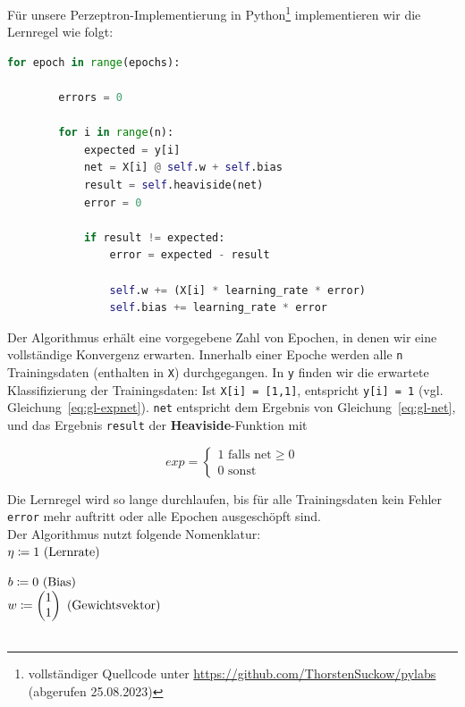 \pagebreak
Für unsere Perzeptron-Implementierung in Python\footnote{
    vollständiger Quellcode unter \url{https://github.com/ThorstenSuckow/pylabs} (abgerufen 25.08.2023)
} implementieren wir die Lernregel wie folgt:


\begin{lstlisting}[language=Python]
    for epoch in range(epochs):

        errors = 0

        for i in range(n):
            expected = y[i]
            net = X[i] @ self.w + self.bias
            result = self.heaviside(net)
            error = 0

            if result != expected:
                error = expected - result

                self.w += (X[i] * learning_rate * error)
                self.bias += learning_rate * error
\end{lstlisting}

\noindent
Der Algorithmus erhält eine vorgegebene Zahl von Epochen, in denen wir eine vollständige Konvergenz erwarten.
Innerhalb einer Epoche werden alle \verb|n| Trainingsdaten (enthalten in \verb|X|) durchgegangen.
In \verb|y| finden wir die erwartete Klassifizierung der Trainingsdaten:
Ist \verb|X[i] = [1,1]|, entspricht \verb|y[i] = 1| (vgl. Gleichung~\ref{eq:gl-expnet}).
\verb|net| entspricht dem Ergebnis von Gleichung~\ref{eq:gl-net}, und das Ergebnis \verb|result| der \textbf{Heaviside}-Funktion mit

\begin{equation}
    exp = \begin{cases}
              1 \text{ falls } \text{net} \geq 0 \\
              0 \text{ sonst}
    \end{cases}
    \label{eq:gl-expnet}
\end{equation}

\noindent
Die Lernregel wird so lange durchlaufen, bis für alle Trainingsdaten kein Fehler \verb|error| mehr auftritt oder alle Epochen ausgeschöpft sind.\\

\noindent
Der Algorithmus nutzt folgende Nomenklatur:\\


$\eta \coloneqq 1 \space \space \text{ (Lernrate)}$

$b \coloneqq 0 \space \space \text{ (Bias)}$\\

$w \coloneqq \begin{pmatrix}
          1 \\
          1
\end{pmatrix}\space \space \text{ (Gewichtsvektor)}$
\\
\\

